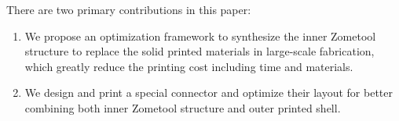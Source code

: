 There are two primary contributions in this paper:
\begin{enumerate}
\item We propose an optimization framework to synthesize the inner Zometool structure to replace the solid printed materials in large-scale fabrication, which greatly reduce the printing cost including time and materials.
\item We design and print a special connector and optimize their layout for better combining both inner Zometool structure and outer printed shell.
\end{enumerate}

